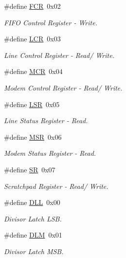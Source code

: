 \begin{DoxyCompactItemize}
\#define \hyperlink{group___serial_ga264b36b13386e3f62fe69e04711bc006}{F\+CR}~0x02
\begin{DoxyCompactList}\small\item\em F\+I\+FO Control Register -\/ Write. \end{DoxyCompactList}\item 
\#define \hyperlink{group___serial_ga851cb396b6eaa97346364a772b439f37}{L\+CR}~0x03
\begin{DoxyCompactList}\small\item\em Line Control Register -\/ Read/ Write. \end{DoxyCompactList}\item 
\#define \hyperlink{group___serial_ga65364db1603cde6f6533cb61bcfcf553}{M\+CR}~0x04
\begin{DoxyCompactList}\small\item\em Modem Control Register -\/ Read/ Write. \end{DoxyCompactList}\item 
\#define \hyperlink{group___serial_gad51d51aee21f6cc77d4955221aee3dcb}{L\+SR}~0x05
\begin{DoxyCompactList}\small\item\em Line Status Register -\/ Read. \end{DoxyCompactList}\item 
\#define \hyperlink{group___serial_gad4806a0bfd996121bc27d2466393207e}{M\+SR}~0x06
\begin{DoxyCompactList}\small\item\em Modem Status Register -\/ Read. \end{DoxyCompactList}\item 
\#define \hyperlink{group___serial_gabaed93a16a0cde13f32bc4dc48b96804}{SR}~0x07
\begin{DoxyCompactList}\small\item\em Scratchpad Register -\/ Read/ Write. \end{DoxyCompactList}\item 
\#define \hyperlink{group___serial_ga4466639cd64ebf372a621168c5e25964}{D\+LL}~0x00
\begin{DoxyCompactList}\small\item\em Divisor Latch L\+SB. \end{DoxyCompactList}\item 
\#define \hyperlink{group___serial_ga3b48b12dc65f62dd40ab1163fe7997fb}{D\+LM}~0x01
\begin{DoxyCompactList}\small\item\em Divisor Latch M\+SB. \end{DoxyCompactList}\item 

\end{DoxyCompactItemize}
